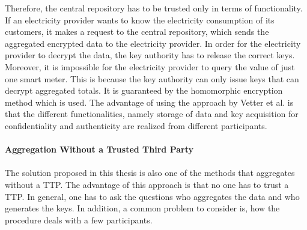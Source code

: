 Therefore, the central repository has to be trusted only in terms of functionality. If an electricity provider wants to know the electricity consumption of its customers, it makes a request to the central repository, which sends the aggregated encrypted data to the electricity provider. In order for the electricity provider to decrypt the data, the key authority has to release the correct keys. Moreover, it is impossible for the electricity provider to query the value of just one smart meter. This is because the key authority can only issue keys that can decrypt aggregated totals. It is guaranteed by the homomorphic encryption method which is used. The advantage of using the approach by Vetter et al. is that the different functionalities, namely storage of data and key acquisition for confidentiality and authenticity are realized from different participants.
\\
\\
\textbf{Aggregation Without a Trusted Third Party}
\\
\\
The solution proposed in this thesis is also one of the methods that aggregates without a \gls{TTP}. The advantage of this approach is that no one has to trust a \gls{TTP}. In general, one has to ask the questions who aggregates the data and who generates the keys. In addition, a common problem to consider is, how the procedure deals with a few participants. \\
